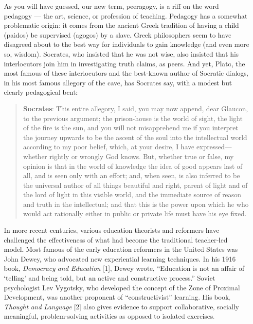 As you will have guessed, our new term, peeragogy, is a riff on the word
pedagogy --- the art, science, or profession of teaching. Pedagogy has a
somewhat problematic origin: it comes from the ancient Greek tradition
of having a child (paidos) be supervised (agogos) by a slave. Greek
philosophers seem to have disagreed about to the best way for
individuals to gain knowledge (and even more so, wisdom). Socrates, who
insisted that he was not wise, also insisted that his interlocutors join
him in investigating truth claims, as peers. And yet, Plato, the most
famous of these interlocutors and the best-known author of Socratic
dialogs, in his most famous allegory of the cave, has Socrates say, with
a modest but clearly pedagogical bent:

\begin{quote}
\textbf{Socrates}: This entire allegory, I said, you may now append,
dear Glaucon, to the previous argument; the prison-house is the world of
sight, the light of the fire is the sun, and you will not misapprehend
me if you interpret the journey upwards to be the ascent of the soul
into the intellectual world according to my poor belief, which, at your
desire, I have expressed---whether rightly or wrongly God knows. But,
whether true or false, my opinion is that in the world of knowledge the
idea of good appears last of all, and is seen only with an effort; and,
when seen, is also inferred to be the universal author of all things
beautiful and right, parent of light and of the lord of light in this
visible world, and the immediate source of reason and truth in the
intellectual; and that this is the power upon which he who would act
rationally either in public or private life must have his eye fixed.
\end{quote}

In more recent centuries, various education theorists and reformers have
challenged the effectiveness of what had become the traditional
teacher-led model. Most famous of the early education reformers in the
United States was John Dewey, who advocated new experiential learning
techniques. In his 1916 book, \emph{Democracy and Education} {[}1{]},
Dewey wrote, ``Education is not an affair of `telling' and being told,
but an active and constructive process.'' Soviet psychologist Lev
Vygotsky, who developed the concept of the Zone of Proximal Development,
was another proponent of ``constructivist'' learning. His book,
\emph{Thought and Language} {[}2{]} also gives evidence to support
collaborative, socially meaningful, problem-solving activities as
opposed to isolated exercises.

